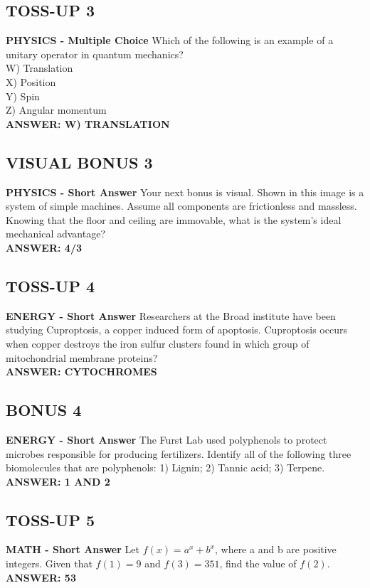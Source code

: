 \documentclass{article}
\begin{document}
\subsection*{TOSS-UP 3}
\textbf{PHYSICS - Multiple Choice} Which of the following is an example of a unitary operator in quantum mechanics? \\
W) Translation \\
X) Position \\
Y) Spin \\
Z) Angular momentum \\
\textbf{ANSWER: W) TRANSLATION}

\subsection*{VISUAL BONUS 3}
\textbf{PHYSICS - Short Answer} Your next bonus is visual. Shown in this image is a system of simple machines. Assume all components are frictionless and massless. Knowing that the floor and ceiling are immovable, what is the system's ideal mechanical advantage? \\
\textbf{ANSWER: 4/3}

\subsection*{TOSS-UP 4}
\textbf{ENERGY - Short Answer} Researchers at the Broad institute have been studying Cuproptosis, a copper induced form of apoptosis. Cuproptosis occurs when copper destroys the iron sulfur clusters found in which group of mitochondrial membrane proteins? \\
\textbf{ANSWER: CYTOCHROMES}

\subsection*{BONUS 4}
\textbf{ENERGY - Short Answer} The Furst Lab used polyphenols to protect microbes responsible for producing fertilizers. Identify all of the following three biomolecules that are polyphenols: 1) Lignin; 2) Tannic acid; 3) Terpene. \\
\textbf{ANSWER: 1 AND 2}

\subsection*{TOSS-UP 5}
\textbf{MATH - Short Answer} Let $f(x)=a^{x}+b^{x}$, where a and b are positive integers. Given that $f(1)=9$ and $f(3)=351$, find the value of $f(2)$. \\
\textbf{ANSWER: 53}
\end{document}
